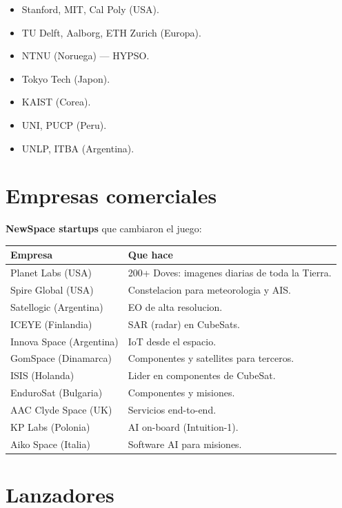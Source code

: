 \documentclass[11pt,a4paper,oneside,openright]{book}
\begin{document}
\begin{itemize}[leftmargin=2em]
  \item Stanford, MIT, Cal Poly (USA).
  \item TU Delft, Aalborg, ETH Zurich (Europa).
  \item NTNU (Noruega) --- HYPSO.
  \item Tokyo Tech (Japon).
  \item KAIST (Corea).
  \item UNI, PUCP (Peru).
  \item UNLP, ITBA (Argentina).
\end{itemize}

\section{Empresas comerciales}

\textbf{NewSpace startups} que cambiaron el juego:

\begin{center}
\begin{tabular}{lp{10cm}}
\toprule
\textbf{Empresa} & \textbf{Que hace} \\
\midrule
Planet Labs (USA)        & 200+ Doves: imagenes diarias de toda la Tierra. \\
Spire Global (USA)       & Constelacion para meteorologia y AIS. \\
Satellogic (Argentina)   & EO de alta resolucion. \\
ICEYE (Finlandia)        & SAR (radar) en CubeSats. \\
Innova Space (Argentina) & IoT desde el espacio. \\
GomSpace (Dinamarca)     & Componentes y satellites para terceros. \\
ISIS (Holanda)           & Lider en componentes de CubeSat. \\
EnduroSat (Bulgaria)     & Componentes y misiones. \\
AAC Clyde Space (UK)     & Servicios end-to-end. \\
KP Labs (Polonia)        & AI on-board (Intuition-1). \\
Aiko Space (Italia)      & Software AI para misiones. \\
\bottomrule
\end{tabular}
\end{center}

\section{Lanzadores}
\end{document}
